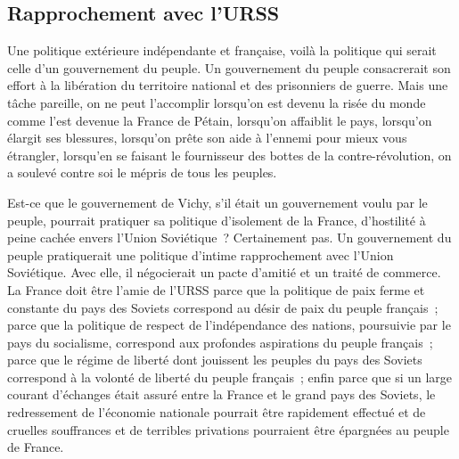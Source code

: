 \documentclass[french,twoside]{book} %
\begin{document}
\subsection[Rapprochement avec l’URSS]{Rapprochement avec l’URSS}
\noindent Une politique extérieure indépendante et française, voilà la politique qui serait celle d’un gouvernement du peuple. Un gouvernement du peuple consacrerait son effort à la libération du territoire national et des prisonniers de guerre. Mais une tâche pareille, on ne peut l’accomplir lorsqu’on est devenu la risée du monde comme l’est devenue la France de Pétain, lorsqu’on affaiblit le pays, lorsqu’on élargit ses blessures, lorsqu’on prête son aide à l’ennemi pour mieux vous étrangler, lorsqu’en se faisant le fournisseur des bottes de la contre-révolution, on a soulevé contre soi le mépris de tous les peuples.\par
Est-ce que le gouvernement de Vichy, s’il était un gouvernement voulu par le peuple, pourrait pratiquer sa politique d’isolement de la France, d’hostilité à peine cachée envers l’Union Soviétique ? Certainement pas. Un gouvernement du peuple pratiquerait une politique d’intime rapprochement avec l’Union Soviétique. Avec elle, il négocierait un pacte d’amitié et un traité de commerce. La France doit être l’amie de l’URSS parce que la politique de paix ferme et constante du pays des Soviets correspond au désir de paix du peuple français ; parce que la politique de respect de l’indépendance des nations, poursuivie par le pays du socialisme, correspond aux profondes aspirations du peuple français ; parce que le régime de liberté dont jouissent les peuples du pays des Soviets correspond à la volonté de liberté du peuple français ; enfin parce que si un large courant d’échanges était assuré entre la France et le grand pays des Soviets, le redressement de l’économie nationale pourrait être rapidement effectué et de cruelles souffrances et de terribles privations pourraient être épargnées au peuple de France.
\end{document}
